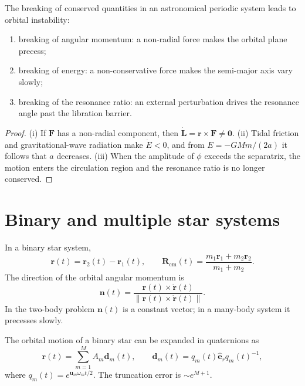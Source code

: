 \begin{proposition}\label{prop:astronomical_conservation_breaking}
The breaking of conserved quantities in an astronomical periodic system leads to orbital instability:
\begin{enumerate}[label=(\roman*)]
    \item breaking of angular momentum: a non-radial force makes the orbital plane precess;
    \item breaking of energy: a non-conservative force makes the semi-major axis vary slowly;
    \item breaking of the resonance ratio: an external perturbation drives the resonance angle past the libration barrier.
\end{enumerate}
\end{proposition}

\begin{proof}
(i) If \(\mathbf F\) has a non-radial component, then \(\dot{\mathbf L}=\mathbf r\times\mathbf F\neq\mathbf 0\).
(ii) Tidal friction and gravitational-wave radiation make \(\dot E<0\), and from \(E=-GMm/(2a)\) it follows that \(a\) decreases.
(iii) When the amplitude of \(\phi\) exceeds the separatrix, the motion enters the circulation region and the resonance ratio is no longer conserved.
\end{proof}

\section{Binary and multiple star systems}

\begin{definition}\label{def:binary_episphere}
In a binary star system,
\[
\mathbf r(t)=\mathbf r_2(t)-\mathbf r_1(t),\qquad
\mathbf R_{\text{cm}}(t)=\frac{m_1\mathbf r_1+m_2\mathbf r_2}{m_1+m_2}.
\]
The direction of the orbital angular momentum is
\[
\mathbf n(t)=\frac{\mathbf r(t)\times\dot{\mathbf r}(t)}{\|\mathbf r(t)\times\dot{\mathbf r}(t)\|}.
\]
In the two-body problem \(\mathbf n(t)\) is a constant vector; in a many-body system it precesses slowly.
\end{definition}

\begin{proposition}\label{prop:binary_episphere_approximation}
The orbital motion of a binary star can be expanded in quaternions as
\[
\mathbf r(t)=\sum_{m=1}^{M}A_m\mathbf d_m(t),\qquad
\mathbf d_m(t)=q_m(t)\hat{\mathbf e}_r q_m(t)^{-1},
\]
where \(q_m(t)=e^{\mathbf u_m\omega_mt/2}\). The truncation error is \(\sim e^{M+1}\).
\end{proposition}

